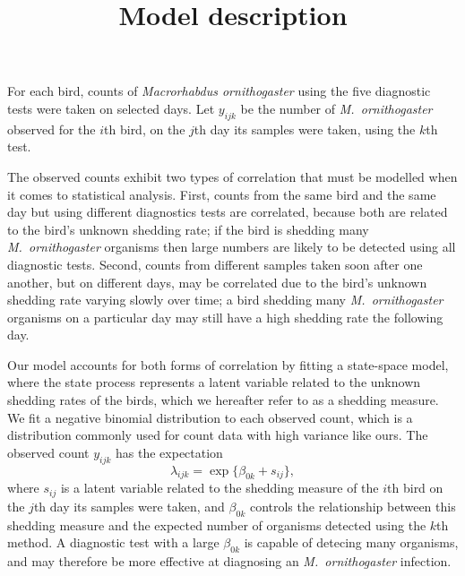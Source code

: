 \documentclass{article}
\title{Model description}
\author{}
\date{}
\begin{document}
\maketitle

For each bird, counts of \emph{Macrorhabdus ornithogaster} using the
five diagnostic tests were taken on selected days. Let $y_{ijk}$ be
the number of \emph{M.\ ornithogaster} observed for the $i$th bird, on
the $j$th day its samples were taken, using the $k$th test. 

The observed counts exhibit two types of correlation that must be
modelled when it comes to statistical analysis. First, counts from the
same bird and the same day but using different diagnostics tests are
correlated, because both are related to the bird's unknown shedding
rate; if the bird is shedding many \emph{M.\ ornithogaster} organisms
then large numbers are likely to be detected using all diagnostic
tests. Second, counts from different samples taken soon after one
another, but on different days, may be correlated due to the bird's
unknown shedding rate varying slowly over time; a bird shedding many
\emph{M.\ ornithogaster} organisms on a particular day may still have
a high shedding rate the following day.

Our model accounts for both forms of correlation by fitting a
state-space model, where the state process represents a latent
variable related to the unknown shedding rates of the birds, which we
hereafter refer to as a shedding measure. We fit a negative binomial
distribution to each observed count, which is a distribution commonly
used for count data with high variance like ours. The observed count
$y_{ijk}$ has the expectation
\begin{equation}
\lambda_{ijk} = \exp\{\beta_{0k} +  s_{ij}\},
\end{equation}
where $s_{ij}$ is a latent variable related to the shedding measure of
the $i$th bird on the $j$th day its samples were taken, and
$\beta_{0k}$ controls the relationship between this shedding measure
and the expected number of organisms detected using the $k$th
method. A diagnostic test with a large $\beta_{0k}$ is capable of
detecing many organisms, and may therefore be more effective at
diagnosing an \emph{M.\ ornithogaster} infection.
\end{document}
